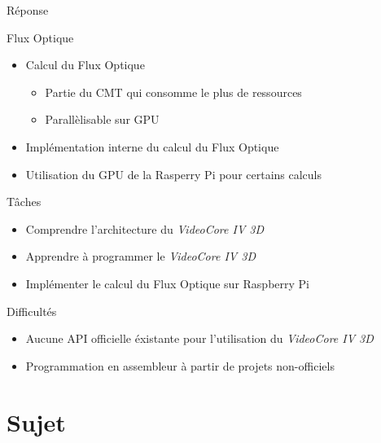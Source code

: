 \documentclass{bredelebeamer}
\begin{document}
\begin{frame}{Réponse}
\begin{block}{Flux Optique}
\begin{itemize}
\item Calcul du Flux Optique
\begin{itemize}
	\item Partie du CMT qui consomme le plus de ressources
	\item Parallèlisable sur GPU
\end{itemize}
\item Implémentation interne du calcul du Flux Optique
\item Utilisation du GPU de la Rasperry Pi pour certains calculs
\end{itemize}
\end{block}

\begin{exampleblock}{Tâches}
\begin{itemize}
	\item Comprendre l'architecture du \emph{VideoCore IV 3D}
	\item Apprendre à programmer le \emph{VideoCore IV 3D}
\item Implémenter le calcul du Flux Optique sur Raspberry Pi
\end{itemize}
\end{exampleblock}

\begin{alertblock}{Difficultés}
\begin{itemize}
	\item Aucune API officielle éxistante pour l'utilisation du \emph{VideoCore IV 3D}
\item Programmation en assembleur à partir de projets non-officiels
\end{itemize}
\end{alertblock}

\end{frame}





\section{Sujet}
\end{document}
